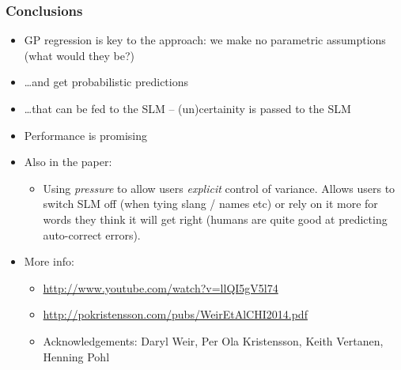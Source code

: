 \begin{frame}
	\frametitle{Conclusions}
		\begin{itemize}
			\item GP regression is key to the approach: we make no parametric assumptions (what would they be?)
			\item \ldots and get probabilistic predictions
			\item \ldots that can be fed to the \ac{SLM} -- (un)certainity is passed to the \ac{SLM}
			\item Performance is promising
			\item<2->Also in the paper:
			\begin{itemize}
				\item Using \emph{pressure} to allow users \emph{explicit} control of variance. Allows users to switch \ac{SLM} off (when tying slang / names etc) or rely on it more for words they think it will get right (humans are quite good at predicting auto-correct errors).
			\end{itemize}
			\item<3->More info:
			\begin{itemize}
				\item \url{http://www.youtube.com/watch?v=llQI5gV5l74}
				\item \url{http://pokristensson.com/pubs/WeirEtAlCHI2014.pdf}
				\item Acknowledgements: Daryl Weir, Per Ola Kristensson, Keith Vertanen, Henning Pohl
			\end{itemize}
		\end{itemize}
\end{frame}

